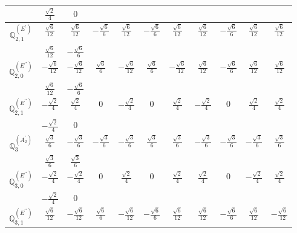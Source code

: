 \documentclass[fleqn,10pt,landscape]{article}
\begin{document}
\begin{itemize}
{\begin{center}
\begin{longtable}{ccccccccccc}
& $ \frac{\sqrt{2}}{4} $ & $ 0 $ & $  $ & $  $ & $  $ & $  $ & $  $ & $  $ & $  $ & $  $ \\ \hline
$\mathbb{Q}_{2,1}^{(E^{\prime})}$ & $ \frac{\sqrt{6}}{12} $ & $ \frac{\sqrt{6}}{12} $ & $ - \frac{\sqrt{6}}{6} $ & $ \frac{\sqrt{6}}{12} $ & $ - \frac{\sqrt{6}}{6} $ & $ \frac{\sqrt{6}}{12} $ & $ \frac{\sqrt{6}}{12} $ & $ - \frac{\sqrt{6}}{6} $ & $ \frac{\sqrt{6}}{12} $ & $ \frac{\sqrt{6}}{12} $ \\
& $ \frac{\sqrt{6}}{12} $ & $ - \frac{\sqrt{6}}{6} $ & $  $ & $  $ & $  $ & $  $ & $  $ & $  $ & $  $ & $  $ \\ \hline
$\mathbb{Q}_{2,0}^{(E^{\prime\prime})}$ & $ - \frac{\sqrt{6}}{12} $ & $ - \frac{\sqrt{6}}{12} $ & $ \frac{\sqrt{6}}{6} $ & $ - \frac{\sqrt{6}}{12} $ & $ \frac{\sqrt{6}}{6} $ & $ - \frac{\sqrt{6}}{12} $ & $ \frac{\sqrt{6}}{12} $ & $ - \frac{\sqrt{6}}{6} $ & $ \frac{\sqrt{6}}{12} $ & $ \frac{\sqrt{6}}{12} $ \\
& $ \frac{\sqrt{6}}{12} $ & $ - \frac{\sqrt{6}}{6} $ & $  $ & $  $ & $  $ & $  $ & $  $ & $  $ & $  $ & $  $ \\ \hline
$\mathbb{Q}_{2,1}^{(E^{\prime\prime})}$ & $ - \frac{\sqrt{2}}{4} $ & $ \frac{\sqrt{2}}{4} $ & $ 0 $ & $ - \frac{\sqrt{2}}{4} $ & $ 0 $ & $ \frac{\sqrt{2}}{4} $ & $ - \frac{\sqrt{2}}{4} $ & $ 0 $ & $ \frac{\sqrt{2}}{4} $ & $ \frac{\sqrt{2}}{4} $ \\
& $ - \frac{\sqrt{2}}{4} $ & $ 0 $ & $  $ & $  $ & $  $ & $  $ & $  $ & $  $ & $  $ & $  $ \\ \hline
$\mathbb{Q}_{3}^{(A_{2}^{\prime})}$ & $ \frac{\sqrt{3}}{6} $ & $ - \frac{\sqrt{3}}{6} $ & $ - \frac{\sqrt{3}}{6} $ & $ - \frac{\sqrt{3}}{6} $ & $ \frac{\sqrt{3}}{6} $ & $ \frac{\sqrt{3}}{6} $ & $ - \frac{\sqrt{3}}{6} $ & $ - \frac{\sqrt{3}}{6} $ & $ - \frac{\sqrt{3}}{6} $ & $ \frac{\sqrt{3}}{6} $ \\
& $ \frac{\sqrt{3}}{6} $ & $ \frac{\sqrt{3}}{6} $ & $  $ & $  $ & $  $ & $  $ & $  $ & $  $ & $  $ & $  $ \\ \hline
$\mathbb{Q}_{3,0}^{(E^{\prime\prime})}$ & $ - \frac{\sqrt{2}}{4} $ & $ - \frac{\sqrt{2}}{4} $ & $ 0 $ & $ \frac{\sqrt{2}}{4} $ & $ 0 $ & $ \frac{\sqrt{2}}{4} $ & $ \frac{\sqrt{2}}{4} $ & $ 0 $ & $ - \frac{\sqrt{2}}{4} $ & $ \frac{\sqrt{2}}{4} $ \\
& $ - \frac{\sqrt{2}}{4} $ & $ 0 $ & $  $ & $  $ & $  $ & $  $ & $  $ & $  $ & $  $ & $  $ \\ \hline
$\mathbb{Q}_{3,1}^{(E^{\prime\prime})}$ & $ \frac{\sqrt{6}}{12} $ & $ - \frac{\sqrt{6}}{12} $ & $ \frac{\sqrt{6}}{6} $ & $ - \frac{\sqrt{6}}{12} $ & $ - \frac{\sqrt{6}}{6} $ & $ \frac{\sqrt{6}}{12} $ & $ \frac{\sqrt{6}}{12} $ & $ - \frac{\sqrt{6}}{6} $ & $ \frac{\sqrt{6}}{12} $ & $ - \frac{\sqrt{6}}{12} $ \\

\end{longtable}
\end{center}}
\end{itemize}
\end{document}

